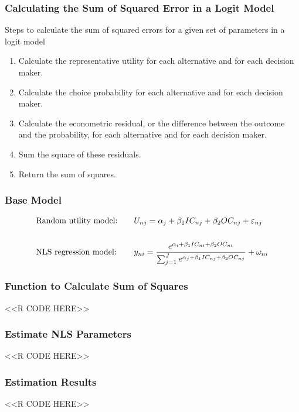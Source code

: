 \documentclass{beamer}
\begin{document}
\begin{frame}\frametitle{Calculating the Sum of Squared Error in a Logit Model}
    Steps to calculate the sum of squared errors for a given set of parameters in a logit model
    \begin{enumerate}
        \item Calculate the representative utility for each alternative and for each decision maker.
        \item Calculate the choice probability for each alternative and for each decision maker.
        \item Calculate the econometric residual, or the difference between the outcome and the probability, for each alternative and for each decision maker.
        \item Sum the square of these residuals.
        \item Return the sum of squares.
    \end{enumerate}
\end{frame}

\begin{frame}\frametitle{Base Model}
    \begin{alignat*}{2}
    &\text{Random utility model:} \quad &&U_{nj} = \alpha_j + \beta_1 IC_{nj} + \beta_2 OC_{nj} + \varepsilon_{nj} \\
    \intertext{}
    &\text{NLS regression model:} \quad &&y_{ni} =  \frac{e^{\alpha_i + \beta_1 IC_{ni} + \beta_2 OC_{ni}}}{\sum_{j = 1}^J e^{\alpha_j + \beta_1 IC_{nj} + \beta_2 OC_{nj}}} + \omega_{ni}
    \end{alignat*}
\end{frame}

\begin{frame}[fragile]\frametitle{Function to Calculate Sum of Squares}
    \vspace{1ex}
    <<R CODE HERE>>
\end{frame}

\begin{frame}[fragile]\frametitle{Estimate NLS Parameters}
    <<R CODE HERE>>
\end{frame}

\begin{frame}[fragile]\frametitle{Estimation Results}
    <<R CODE HERE>>
\end{frame}
\end{document}

